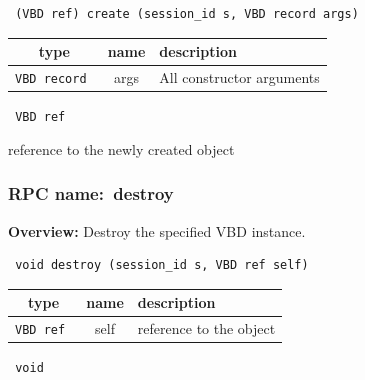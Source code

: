 \begin{verbatim} (VBD ref) create (session_id s, VBD record args)\end{verbatim}



 
\vspace{0.3cm}
\begin{tabular}{|c|c|p{7cm}|}
 \hline
{\bf type} & {\bf name} & {\bf description} \\ \hline
{\tt VBD record } & args & All constructor arguments \\ \hline 

\end{tabular}

\vspace{0.3cm}

{\tt 
VBD ref
}


reference to the newly created object
\vspace{0.3cm}
\vspace{0.3cm}
\vspace{0.3cm}
\subsubsection{RPC name:~destroy}

{\bf Overview:} 
Destroy the specified VBD instance.

\begin{verbatim} void destroy (session_id s, VBD ref self)\end{verbatim}



 
\vspace{0.3cm}
\begin{tabular}{|c|c|p{7cm}|}
 \hline
{\bf type} & {\bf name} & {\bf description} \\ \hline
{\tt VBD ref } & self & reference to the object \\ \hline 

\end{tabular}

\vspace{0.3cm}

{\tt 
void
}



\vspace{0.3cm}
\vspace{0.3cm}
\vspace{0.3cm}
